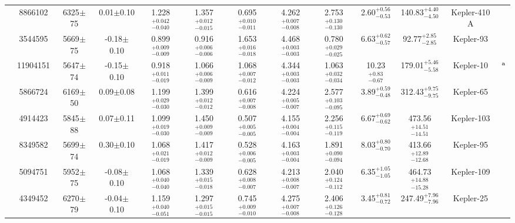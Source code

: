 \begin{table}
\begin{tabular}{ccccccccccccc}
\smallskip
  42 &         8866102 & 6325$\pm$ 75 &  0.01$\pm$0.10 & 1.228$^{+ 0.042}_{-0.040}$& 1.357$^{+ 0.012}_{-0.015}$& 0.695$^{+ 0.010}_{-0.011}$& 4.262$^{+ 0.007}_{-0.008}$&  2.753$^{+ 0.130}_{-0.130}$&  2.60$^{+ 0.56}_{-0.53}$&140.83$^{+  4.40}_{-  4.50}$ &        Kepler-410 A &\citet{VanEylen:2014cy}  \\
\smallskip
  69 &         3544595 & 5669$\pm$ 75 & -0.18$\pm$0.10 & 0.899$^{+ 0.009}_{-0.009}$& 0.916$^{+ 0.006}_{-0.006}$& 1.653$^{+ 0.016}_{-0.018}$& 4.468$^{+ 0.003}_{-0.003}$&  0.780$^{+ 0.029}_{-0.025}$&  6.63$^{+ 0.62}_{-0.57}$& 92.77$^{+  2.85}_{-  2.85}$ &            Kepler-93 &\citet{Ballard:2014je}  \\
\smallskip
  72 &        11904151 & 5647$\pm$ 74 & -0.15$\pm$0.10 & 0.918$^{+ 0.011}_{-0.019}$& 1.066$^{+ 0.006}_{-0.009}$& 1.068$^{+ 0.007}_{-0.012}$& 4.344$^{+ 0.003}_{-0.003}$&  1.063$^{+ 0.032}_{-0.034}$& 10.23$^{+ 0.83}_{-0.67}$&179.01$^{+  5.46}_{-  5.58}$ &  Kepler-10 &\citet{Batalha:2011fs}$^{\rm a}$  \\
\smallskip
  85 &         5866724 & 6169$\pm$ 50 &  0.09$\pm$0.08 & 1.199$^{+ 0.029}_{-0.030}$& 1.399$^{+ 0.012}_{-0.012}$& 0.616$^{+ 0.007}_{-0.008}$& 4.224$^{+ 0.005}_{-0.007}$&  2.577$^{+ 0.103}_{-0.095}$&  3.89$^{+ 0.59}_{-0.48}$&312.43$^{+  9.75}_{-  9.75}$ &            Kepler-65 &\citet{Chaplin:2013dg}  \\
\smallskip
 108 &         4914423 & 5845$\pm$ 88 &  0.07$\pm$0.11 & 1.099$^{+ 0.019}_{-0.030}$& 1.450$^{+ 0.009}_{-0.009}$& 0.507$^{+ 0.005}_{-0.005}$& 4.155$^{+ 0.004}_{-0.004}$&  2.256$^{+ 0.115}_{-0.119}$&  6.67$^{+ 0.69}_{-0.62}$&473.56$^{+ 14.51}_{- 14.51}$ &             Kepler-103 &\citet{Marcy:2014hr}  \\
\smallskip
 122 &         8349582 & 5699$\pm$ 74 &  0.30$\pm$0.10 & 1.068$^{+ 0.021}_{-0.019}$& 1.417$^{+ 0.012}_{-0.009}$& 0.528$^{+ 0.006}_{-0.005}$& 4.163$^{+ 0.003}_{-0.004}$&  1.891$^{+ 0.090}_{-0.094}$&  8.03$^{+ 0.80}_{-0.70}$&413.66$^{+ 12.89}_{- 12.68}$ &              Kepler-95 &\citet{Marcy:2014hr}  \\
\smallskip
 123 &         5094751 & 5952$\pm$ 75 & -0.08$\pm$0.10 & 1.068$^{+ 0.040}_{-0.040}$& 1.339$^{+ 0.015}_{-0.018}$& 0.628$^{+ 0.008}_{-0.007}$& 4.213$^{+ 0.008}_{-0.007}$&  2.040$^{+ 0.124}_{-0.112}$&  6.35$^{+ 1.05}_{-1.05}$&464.73$^{+ 14.88}_{- 15.28}$ &             Kepler-109 &\citet{Marcy:2014hr}  \\
\smallskip
 244 &         4349452 & 6270$\pm$ 79 & -0.04$\pm$0.10 & 1.159$^{+ 0.040}_{-0.051}$& 1.297$^{+ 0.015}_{-0.015}$& 0.745$^{+ 0.009}_{-0.010}$& 4.275$^{+ 0.007}_{-0.008}$&  2.406$^{+ 0.126}_{-0.128}$&  3.45$^{+ 0.81}_{-0.72}$&247.49$^{+  7.96}_{-  7.96}$ &            Kepler-25 &\citet{Steffen:2012kx}  \\

\end{tabular}
\end{table}
